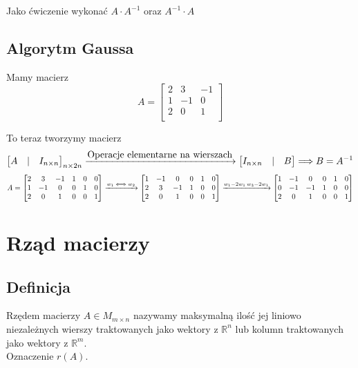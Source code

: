 \documentclass[11pt]{article}
\begin{document}
Jako ćwiczenie wykonać $A \cdot A^{-1}$ oraz $A^{-1} \cdot A$

\subsection{Algorytm Gaussa}
Mamy macierz $$ A = \begin{bmatrix}
	2 & 3 & -1\\
	1 & -1 & 0\\
2 & 0 & 1\\
\end{bmatrix}$$

To teraz tworzymy macierz \\
$$\begin{bmatrix}
	A & | & I_{n \times n} 
\end{bmatrix}_{n\times 2n} \xrightarrow{\hbox{Operacje elementarne na wierszach}}\begin{bmatrix}
	I_{n \times n} & | & B\\
\end{bmatrix} \Longrightarrow B = A^{-1}
$$
$$ A = \begin{bmatrix}
	2 & 3 & -1 & 1 & 0 & 0\\
	1 & -1 & 0 & 0 & 1 & 0\\
2 & 0 & 1 & 0 & 0 & 1\\
\end{bmatrix} \xrightarrow{w_1 \iff w_2} \begin{bmatrix}
	1 & -1 & 0 & 0 & 1 & 0\\
	2 & 3 & -1 & 1 & 0 & 0\\
2 & 0 & 1 & 0 & 0 & 1\\
\end{bmatrix} \xrightarrow{w_1 - 2w_1 \\ w_3 - 2w_1} 
\begin{bmatrix}
	1 & -1 & 0 & 0 & 1 & 0\\
	0 & -1 & -1 & 1 & 0 & 0\\
2 & 0 & 1 & 0 & 0 & 1\\
\end{bmatrix}$$

\section{Rząd macierzy}
\subsection{Definicja}
Rzędem macierzy $A \in M_{m \times n}$ nazywamy maksymalną ilość jej liniowo niezależnych wierszy traktowanych jako wektory z $\mathbb{R}^n$ lub kolumn traktowanych jako wektory z $\mathbb{R}^m$. \\ Oznaczenie $ r{(A)}$.
\end{document}
